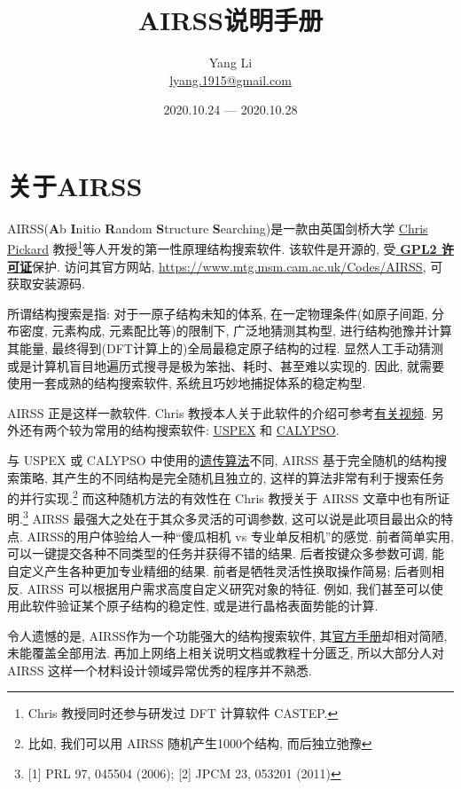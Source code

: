 \documentclass[a4paper, 10pt]{article}
\title{\textbf{AIRSS说明手册}}
\author{Yang Li\\ \href{mailto:lyang.1915@gmail.com}{lyang.1915@gmail.com}}
\date{2020.10.24 --- 2020.10.28}
\begin{document}
\maketitle
\tableofcontents

\newpage
\section{关于AIRSS}
AIRSS(\textbf{A}b \textbf{I}nitio \textbf{R}andom \textbf{S}tructure \textbf{S}earching)是一款由英国剑桥大学 \href{https://www.mtg.msm.cam.ac.uk/People/CJP}{Chris Pickard} 教授\footnote{Chris 教授同时还参与研发过 DFT 计算软件 CASTEP.}等人开发的第一性原理结构搜索软件. 该软件是开源的, 受\href{https://en.wikipedia.org/wiki/GNU_General_Public_License}{\textbf{ GPL2 许可证}}保护. 访问其官方网站, \url{https://www.mtg.msm.cam.ac.uk/Codes/AIRSS}, 可获取安装源码. 
  
所谓结构搜索是指: 对于一原子结构未知的体系, 在一定物理条件(如原子间距, 分布密度, 元素构成, 元素配比等)的限制下, 广泛地猜测其构型, 进行结构弛豫并计算其能量, 最终得到(DFT计算上的)全局最稳定原子结构的过程. 显然人工手动猜测或是计算机盲目地遍历式搜寻是极为笨拙、耗时、甚至难以实现的. 因此, 就需要使用一套成熟的结构搜索软件, 系统且巧妙地捕捉体系的稳定构型.
    
AIRSS 正是这样一款软件. Chris 教授本人关于此软件的介绍可参考\href{https://www.youtube.com/watch?v=xW6pOYEIKVs&t=1061s}{有关视频}. 另外还有两个较为常用的结构搜索软件: \href{http://uspex.stonybrook.edu/uspex.html}{USPEX} 和 \href{http://www.calypso.cn}{CALYPSO}.

与 USPEX 或 CALYPSO 中使用的\href{https://en.wikipedia.org/wiki/Genetic_algorithm}{遗传算法}不同, AIRSS 基于完全随机的结构搜索策略, 其产生的不同结构是完全随机且独立的, 这样的算法非常有利于搜索任务的并行实现.\footnote{比如, 我们可以用 AIRSS 随机产生1000个结构, 而后独立弛豫} 而这种随机方法的有效性在 Chris 教授关于 AIRSS 文章中也有所证明.\footnote{ [1] PRL 97, 045504 (2006); [2] JPCM 23, 053201 (2011)} AIRSS 最强大之处在于其众多灵活的可调参数, 这可以说是此项目最出众的特点. AIRSS的用户体验给人一种``傻瓜相机 vs 专业单反相机''的感觉. 前者简单实用, 可以一键提交各种不同类型的任务并获得不错的结果. 后者按键众多参数可调, 能自定义产生各种更加专业精细的结果. 前者是牺牲灵活性换取操作简易; 后者则相反. AIRSS 可以根据用户需求高度自定义研究对象的特征. 例如, 我们甚至可以使用此软件验证某个原子结构的稳定性, 或是进行晶格表面势能的计算.

令人遗憾的是, AIRSS作为一个功能强大的结构搜索软件, 其\href{https://airss-docs.github.io/technical-reference/buildcell-manual/}{官方手册}却相对简陋, 未能覆盖全部用法. 再加上网络上相关说明文档或教程十分匮乏, 所以大部分人对 AIRSS 这样一个材料设计领域异常优秀的程序并不熟悉. 
\end{document}
